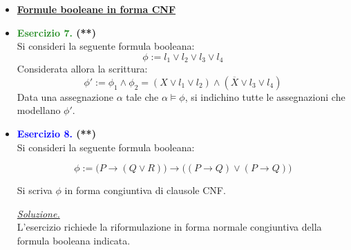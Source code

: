 \documentclass[a4paper,10pt]{article}
\begin{document}
    {\normalsize
    \begin{itemize}[label=, leftmargin=0pt]
    

    
    

    
    \item \textbf{\underline{Formule booleane in forma CNF}}
    
    \item \textbf{\textcolor{ForestGreen}{Esercizio 7.} (**)}\\ 	
    Si consideri la seguente formula booleana:
    $$\phi:= l_1\lor l_2 \lor l_3 \lor l_4$$
    Considerata allora la scrittura:
    $$\phi':=\phi_1\land \phi_2 = (X\lor l_1\lor l_2)\land(\overline{X} \lor l_3\lor l_4)$$
    Data una assegnazione $\alpha$ tale che $\alpha \models \phi$, si indichino tutte le assegnazioni che modellano $\phi'$.


    \item \textbf{\textcolor{blue}{Esercizio 8.} (**)}\\ 	
    Si consideri la seguente formula booleana:

    $$\phi:= \bigg(P \rightarrow (Q\lor R)\bigg)\rightarrow \bigg( (P\rightarrow Q) \lor (P\rightarrow Q) \bigg)$$
    
    Si scriva $\phi$ in forma congiuntiva di clausole CNF.

    \begin{osservazioni}
    \underline{\textit{Soluzione.}}\\
    L'esercizio richiede la riformulazione in forma normale congiuntiva della formula booleana indicata.


\end{osservazioni}
\end{itemize}}
\end{document}

